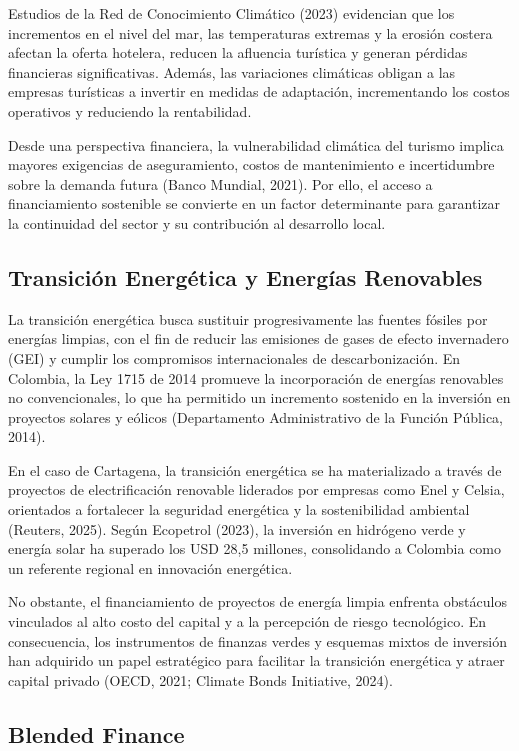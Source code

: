 Estudios de la Red de Conocimiento Climático (2023) evidencian que los incrementos en el nivel del mar, las temperaturas extremas y la erosión costera afectan la oferta hotelera, reducen la afluencia turística y generan pérdidas financieras significativas. Además, las variaciones climáticas obligan a las empresas turísticas a invertir en medidas de adaptación, incrementando los costos operativos y reduciendo la rentabilidad.

Desde una perspectiva financiera, la vulnerabilidad climática del turismo implica mayores exigencias de aseguramiento, costos de mantenimiento e incertidumbre sobre la demanda futura (Banco Mundial, 2021). Por ello, el acceso a financiamiento sostenible se convierte en un factor determinante para garantizar la continuidad del sector y su contribución al desarrollo local.

\subsection{Transición Energética y Energías Renovables}

La transición energética busca sustituir progresivamente las fuentes fósiles por energías limpias, con el fin de reducir las emisiones de gases de efecto invernadero (GEI) y cumplir los compromisos internacionales de descarbonización. En Colombia, la Ley 1715 de 2014 promueve la incorporación de energías renovables no convencionales, lo que ha permitido un incremento sostenido en la inversión en proyectos solares y eólicos (Departamento Administrativo de la Función Pública, 2014).

En el caso de Cartagena, la transición energética se ha materializado a través de proyectos de electrificación renovable liderados por empresas como Enel y Celsia, orientados a fortalecer la seguridad energética y la sostenibilidad ambiental (Reuters, 2025). Según Ecopetrol (2023), la inversión en hidrógeno verde y energía solar ha superado los USD 28,5 millones, consolidando a Colombia como un referente regional en innovación energética.

No obstante, el financiamiento de proyectos de energía limpia enfrenta obstáculos vinculados al alto costo del capital y a la percepción de riesgo tecnológico. En consecuencia, los instrumentos de finanzas verdes y esquemas mixtos de inversión han adquirido un papel estratégico para facilitar la transición energética y atraer capital privado (OECD, 2021; Climate Bonds Initiative, 2024).

\subsection{Blended Finance}

